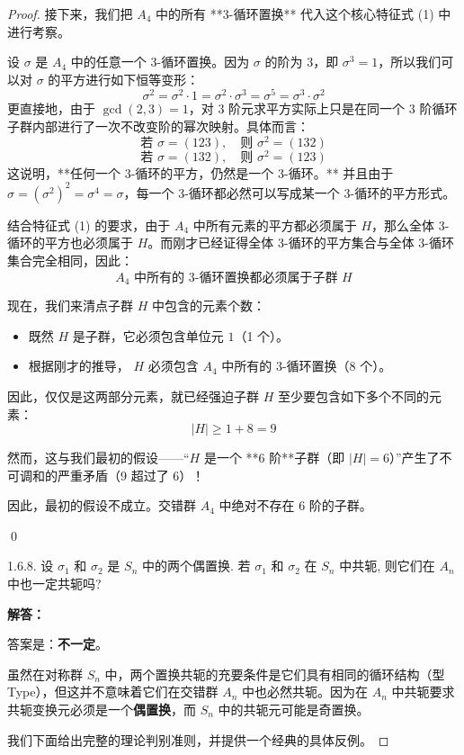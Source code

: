 \documentclass[]{article}
\begin{document}
\begin{proof}
\bigskip
接下来，我们把 $A_4$ 中的所有 **3-循环置换** 代入这个核心特征式 (1) 中进行考察。

设 $\sigma$ 是 $A_4$ 中的任意一个 3-循环置换。因为 $\sigma$ 的阶为 3，即 $\sigma^3 = 1$，所以我们可以对 $\sigma$ 的平方进行如下恒等变形：
\[ \sigma^2 = \sigma^2 \cdot 1 = \sigma^2 \cdot \sigma^3 = \sigma^5 = \sigma^3 \cdot \sigma^2 \]
更直接地，由于 $\gcd(2, 3) = 1$，对 3 阶元求平方实际上只是在同一个 3 阶循环子群内部进行了一次不改变阶的幂次映射。具体而言：
\[ \text{若 } \sigma = (123), \quad \text{则 } \sigma^2 = (132) \]
\[ \text{若 } \sigma = (132), \quad \text{则 } \sigma^2 = (123) \]
这说明，**任何一个 3-循环的平方，仍然是一个 3-循环。** 
并且由于 $\sigma = (\sigma^2)^2 = \sigma^4 = \sigma$，每一个 3-循环都必然可以写成某一个 3-循环的平方形式。

结合特征式 (1) 的要求，由于 $A_4$ 中所有元素的平方都必须属于 $H$，那么全体 3-循环的平方也必须属于 $H$。而刚才已经证得全体 3-循环的平方集合与全体 3-循环集合完全相同，因此：
\[ A_4 \text{ 中所有的 3-循环置换都必须属于子群 } H \]

\bigskip
现在，我们来清点子群 $H$ 中包含的元素个数：
\begin{itemize}
	\item 既然 $H$ 是子群，它必须包含单位元 $1$（1 个）。
	\item 根据刚才的推导， $H$ 必须包含 $A_4$ 中所有的 3-循环置换（8 个）。
\end{itemize}

因此，仅仅是这两部分元素，就已经强迫子群 $H$ 至少要包含如下多个不同的元素：
\[ |H| \ge 1 + 8 = 9 \]

然而，这与我们最初的假设——“$H$ 是一个 **6 阶**子群（即 $|H| = 6$）”产生了不可调和的严重矛盾（9 超过了 6）！

因此，最初的假设不成立。交错群 $A_{4}$ 中绝对不存在 6 阶的子群。

\qed

1.6.8. 设 $\sigma_{1}$ 和 $\sigma_{2}$ 是 $S_{n}$ 中的两个偶置换. 若 $\sigma_{1}$ 和 $\sigma_{2}$ 在 $S_{n}$ 中共轭, 则它们在 $A_{n}$ 中也一定共轭吗? 

\bigskip
\noindent \textbf{解答：} 

答案是：\textbf{不一定}。

虽然在对称群 $S_n$ 中，两个置换共轭的充要条件是它们具有相同的循环结构（型 Type），但这并不意味着它们在交错群 $A_n$ 中也必然共轭。因为在 $A_n$ 中共轭要求共轭变换元必须是一个\textbf{偶置换}，而 $S_n$ 中的共轭元可能是奇置换。

我们下面给出完整的理论判别准则，并提供一个经典的具体反例。


\end{proof}
\end{document}
